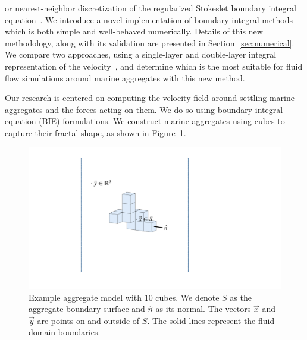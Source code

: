 or nearest-neighbor discretization of the regularized Stokeslet boundary integral equation~\cite{smith_nearest-neighbour_2018}.
 We introduce a novel implementation of boundary integral methods which is both simple and well-behaved numerically. 
Details of this new methodology, along with its validation are presented in Section~\ref{sec:numerical}. We compare two approaches, using a single-layer and double-layer integral representation of the velocity~\cite{pozrikidis_boundary_1992, power_second_1987, ingber_comparison_1999}, and determine which is the most suitable for fluid flow simulations around marine aggregates with this new method.


 \par
Our research is centered on computing the velocity field around settling marine aggregates and the forces acting on them. We do so using boundary integral equation (BIE) formulations. We construct marine aggregates using cubes to capture their fractal shape, as shown in Figure~\ref{fig_cube10}. 
\begin{figure}[ht]

	\begin{center}
		\includegraphics[scale=0.25]{figures/fig_sample_cube10.pdf}

	\caption{Example aggregate model with 10 cubes. We denote $S$ as the aggregate boundary surface and $\hat{n}$ as its normal. The vectors $\vec{x}$ and $\vec{y}$ are points on and outside of $S$. The solid lines represent the fluid domain boundaries. } 

\label{fig_cube10}
\end{center}
\end{figure}


